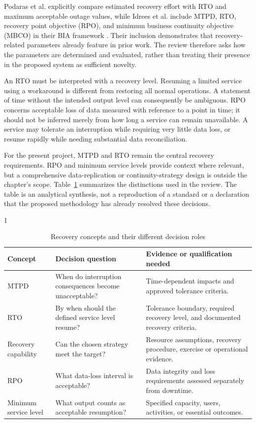 Podaras et al. explicitly compare estimated recovery effort with RTO and maximum acceptable outage values, while Idrees et al. include MTPD, RTO, recovery point objective (RPO), and minimum business continuity objective (MBCO) in their BIA framework \cite{podaras2016tools,idrees2019bcis}. Their inclusion demonstrates that recovery-related parameters already feature in prior work. The review therefore asks how the parameters are determined and evaluated, rather than treating their presence in the proposed system as sufficient novelty.

An RTO must be interpreted with a recovery level. Resuming a limited service using a workaround is different from restoring all normal operations. A statement of time without the intended output level can consequently be ambiguous. RPO concerns acceptable loss of data measured with reference to a point in time; it should not be inferred merely from how long a service can remain unavailable. A service may tolerate an interruption while requiring very little data loss, or resume rapidly while needing substantial data reconciliation.

For the present project, MTPD and RTO remain the central recovery requirements. RPO and minimum service levels provide context where relevant, but a comprehensive data-replication or continuity-strategy design is outside the chapter's scope. Table~\ref{tab:recovery-concepts} summarizes the distinctions used in the review. The table is an analytical synthesis, not a reproduction of a standard or a declaration that the proposed methodology has already resolved these decisions.

\begin{table}[htbp]
\centering
\caption{Recovery concepts and their different decision roles}
\label{tab:recovery-concepts}
\begin{spacing}{1}
\small
\begin{tabularx}{\textwidth}{@{}>{\raggedright\arraybackslash}p{2.3cm}>{\raggedright\arraybackslash}X>{\raggedright\arraybackslash}X@{}}
\toprule
Concept & Decision question & Evidence or qualification needed \\
\midrule
MTPD & When do interruption consequences become unacceptable? & Time-dependent impacts and approved tolerance criteria. \\
RTO & By when should the defined service level resume? & Tolerance boundary, required recovery level, and documented recovery criteria. \\
Recovery capability & Can the chosen strategy meet the target? & Resource assumptions, recovery procedure, exercise or operational evidence. \\
RPO & What data-loss interval is acceptable? & Data integrity and loss requirements assessed separately from downtime. \\
Minimum service level & What output counts as acceptable resumption? & Specified capacity, users, activities, or essential outcomes. \\
\bottomrule
\end{tabularx}
\end{spacing}
\end{table}

